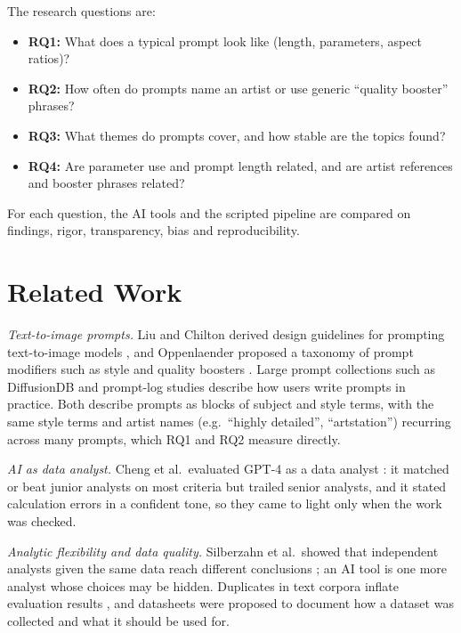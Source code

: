 \documentclass[conference]{IEEEtran}
\begin{document}
The research questions are:
\begin{itemize}
  \item \textbf{RQ1:} What does a typical prompt look like (length,
        parameters, aspect ratios)?
  \item \textbf{RQ2:} How often do prompts name an artist or use generic
        ``quality booster'' phrases?
  \item \textbf{RQ3:} What themes do prompts cover, and how stable are the
        topics found?
  \item \textbf{RQ4:} Are parameter use and prompt length related, and are
        artist references and booster phrases related?
\end{itemize}
For each question, the AI tools and the scripted pipeline are compared on
findings, rigor, transparency, bias and reproducibility.

\section{Related Work}

\textit{Text-to-image prompts.} Liu and Chilton derived design guidelines
for prompting text-to-image models \cite{liuDesignGuidelinesPrompt2022},
and Oppenlaender proposed a taxonomy of prompt modifiers such as style and
quality boosters \cite{oppenlaenderTaxonomyPromptModifiers2023}. Large
prompt collections such as DiffusionDB \cite{wangDiffusionDB2023} and
prompt-log studies \cite{xiePromptLogAnalysis2023} describe how users write
prompts in practice.
Both describe prompts as blocks of subject and style terms, with the same
style terms and artist names (e.g.\ ``highly detailed'', ``artstation'')
recurring across many prompts, which RQ1 and RQ2 measure directly.

\textit{AI as data analyst.} Cheng et al.\ evaluated GPT-4 as a data
analyst \cite{chengGPT4GoodData2023}: it matched or beat junior analysts on most
criteria but trailed senior analysts, and it stated calculation errors in
a confident tone, so they came to light only when the work was checked.

\textit{Analytic flexibility and data quality.} Silberzahn et al.\ showed
that independent analysts given the same data reach different conclusions
\cite{silberzahnManyAnalysts2018}; an AI tool is one more analyst whose
choices may be hidden. Duplicates in text corpora inflate evaluation
results \cite{leeDeduplicating2022}, and datasheets
\cite{gebruDatasheets2021} were proposed to document how a dataset was
collected and what it should be used for.
\end{document}
